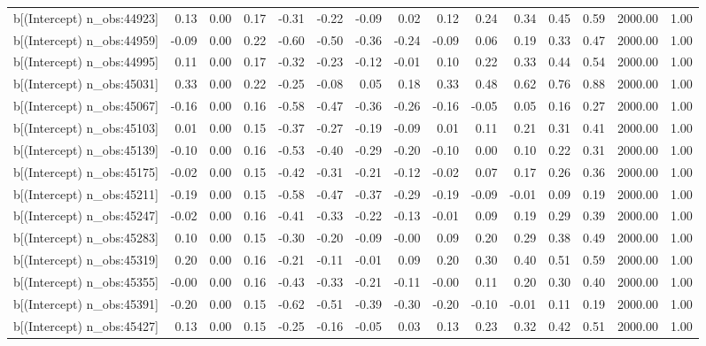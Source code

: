 \begin{table}[ht]
\begin{tabular}{rrrrrrrrrrrrrrr}
  b[(Intercept) n\_obs:44923] & 0.13 & 0.00 & 0.17 & -0.31 & -0.22 & -0.09 & 0.02 & 0.12 & 0.24 & 0.34 & 0.45 & 0.59 & 2000.00 & 1.00 \\ 
  b[(Intercept) n\_obs:44959] & -0.09 & 0.00 & 0.22 & -0.60 & -0.50 & -0.36 & -0.24 & -0.09 & 0.06 & 0.19 & 0.33 & 0.47 & 2000.00 & 1.00 \\ 
  b[(Intercept) n\_obs:44995] & 0.11 & 0.00 & 0.17 & -0.32 & -0.23 & -0.12 & -0.01 & 0.10 & 0.22 & 0.33 & 0.44 & 0.54 & 2000.00 & 1.00 \\ 
  b[(Intercept) n\_obs:45031] & 0.33 & 0.00 & 0.22 & -0.25 & -0.08 & 0.05 & 0.18 & 0.33 & 0.48 & 0.62 & 0.76 & 0.88 & 2000.00 & 1.00 \\ 
  b[(Intercept) n\_obs:45067] & -0.16 & 0.00 & 0.16 & -0.58 & -0.47 & -0.36 & -0.26 & -0.16 & -0.05 & 0.05 & 0.16 & 0.27 & 2000.00 & 1.00 \\ 
  b[(Intercept) n\_obs:45103] & 0.01 & 0.00 & 0.15 & -0.37 & -0.27 & -0.19 & -0.09 & 0.01 & 0.11 & 0.21 & 0.31 & 0.41 & 2000.00 & 1.00 \\ 
  b[(Intercept) n\_obs:45139] & -0.10 & 0.00 & 0.16 & -0.53 & -0.40 & -0.29 & -0.20 & -0.10 & 0.00 & 0.10 & 0.22 & 0.31 & 2000.00 & 1.00 \\ 
  b[(Intercept) n\_obs:45175] & -0.02 & 0.00 & 0.15 & -0.42 & -0.31 & -0.21 & -0.12 & -0.02 & 0.07 & 0.17 & 0.26 & 0.36 & 2000.00 & 1.00 \\ 
  b[(Intercept) n\_obs:45211] & -0.19 & 0.00 & 0.15 & -0.58 & -0.47 & -0.37 & -0.29 & -0.19 & -0.09 & -0.01 & 0.09 & 0.19 & 2000.00 & 1.00 \\ 
  b[(Intercept) n\_obs:45247] & -0.02 & 0.00 & 0.16 & -0.41 & -0.33 & -0.22 & -0.13 & -0.01 & 0.09 & 0.19 & 0.29 & 0.39 & 2000.00 & 1.00 \\ 
  b[(Intercept) n\_obs:45283] & 0.10 & 0.00 & 0.15 & -0.30 & -0.20 & -0.09 & -0.00 & 0.09 & 0.20 & 0.29 & 0.38 & 0.49 & 2000.00 & 1.00 \\ 
  b[(Intercept) n\_obs:45319] & 0.20 & 0.00 & 0.16 & -0.21 & -0.11 & -0.01 & 0.09 & 0.20 & 0.30 & 0.40 & 0.51 & 0.59 & 2000.00 & 1.00 \\ 
  b[(Intercept) n\_obs:45355] & -0.00 & 0.00 & 0.16 & -0.43 & -0.33 & -0.21 & -0.11 & -0.00 & 0.11 & 0.20 & 0.30 & 0.40 & 2000.00 & 1.00 \\ 
  b[(Intercept) n\_obs:45391] & -0.20 & 0.00 & 0.15 & -0.62 & -0.51 & -0.39 & -0.30 & -0.20 & -0.10 & -0.01 & 0.11 & 0.19 & 2000.00 & 1.00 \\ 
  b[(Intercept) n\_obs:45427] & 0.13 & 0.00 & 0.15 & -0.25 & -0.16 & -0.05 & 0.03 & 0.13 & 0.23 & 0.32 & 0.42 & 0.51 & 2000.00 & 1.00 \\ 

\end{tabular}
\end{table}
